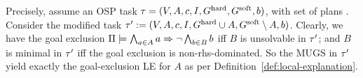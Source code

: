 Precisely, assume an OSP task $\tau =
(V,\allowbreak A,\allowbreak{\ensuremath{c}},\allowbreak I,\allowbreak G^{\text{\textup{hard}}},\allowbreak G^{\text{\textup{soft}}},\allowbreak{\ensuremath{b}})$,
with set of plans \plans. Consider the modified task $\tau' :=
(V,\allowbreak A,\allowbreak{\ensuremath{c}},\allowbreak I,\allowbreak G^{\text{\textup{hard}}}
\cup A,\allowbreak G^{\text{\textup{soft}}} \setminus
A,\allowbreak{\ensuremath{b}})$. Clearly, we have the goal exclusion
$\Pi \models \bigwedge_{a \in A} a \Rightarrow \neg \bigwedge_{b \in B} b$
iff $B$ is unsolvable in $\tau'$; and $B$ is minimal in $\tau'$ iff
the goal exclusion is non-rhs-dominated. So the MUGS in $\tau'$ yield
exactly the goal-exclusion LE for $A$ as per
Definition~\ref{def:local-explanation}.

%
%
%
%
%


